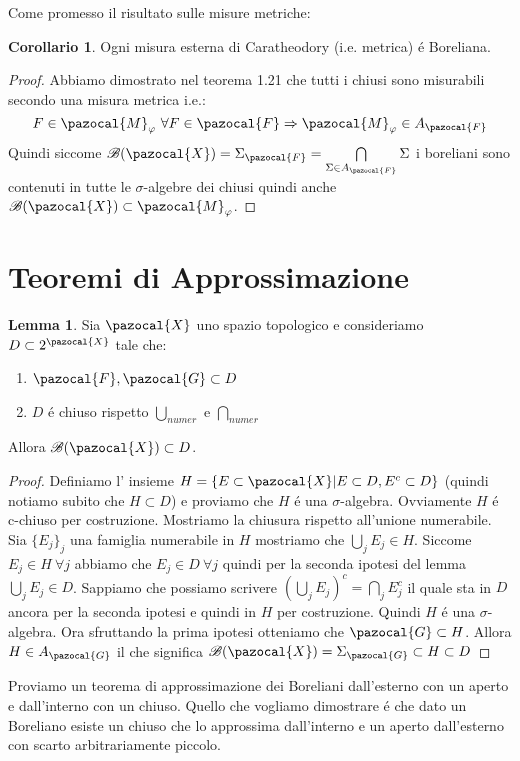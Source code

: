 \documentclass[11pt,a4paper]{report}
\theoremstyle{plain}
\theoremstyle{definition}
\newtheorem{cor}[thm]{Corollario} %
\newtheorem{lem}[thm]{Lemma} %
\newcommand{\M}{\pazocal{M}_\varphi}
\newcommand{\X}{\pazocal{X}}
\newcommand{\F}{\pazocal{F}}
\newcommand{\G}{\pazocal{G}}
\newcommand{\B}{\mathcal{B}}
\begin{document}
Come promesso il risultato sulle misure metriche:

\begin{cor}
	Ogni misura esterna di Caratheodory (i.e. metrica) \'e Boreliana.
	\begin{proof}
		Abbiamo dimostrato nel teorema 1.21 che tutti i chiusi sono misurabili secondo una misura metrica i.e.:
		\[
			F \in \M \ \forall F\in \F \Rightarrow \M \in A_\F
		\]
		Quindi siccome $\B(\X) = \Sigma_\F = \bigcap\limits_{\Sigma \in A_\F}\Sigma$ i boreliani sono contenuti in tutte le $\sigma$-algebre dei chiusi quindi anche $\B(\X)\subset \M$.
	\end{proof}
\end{cor}

\section{Teoremi di Approssimazione}

\begin{lem}
	Sia $\X$ uno spazio topologico e consideriamo $D \subset 2^\X$ tale che:
	\begin{enumerate}
		\item $\F,\G \subset D$
		\item $D$ \'e chiuso rispetto $\bigcup\limits_{numer}$ e $\bigcap\limits_{numer}$
	\end{enumerate}
	Allora $\B(\X) \subset D$.

	\begin{proof}
		Definiamo l' insieme $H=\left\{E \subset \X| E\subset D, E^c \subset D\right\}$ (quindi notiamo subito che $H \subset D$) e proviamo che $H$ \'e una $\sigma$-algebra. Ovviamente $H$ \'e c-chiuso per costruzione. Mostriamo la chiusura rispetto all'unione numerabile.
		Sia $\{E_j\}_j$ una famiglia numerabile in $H$ mostriamo che $\bigcup\limits_{j}E_j \in H$. Siccome $E_j \in H \ \forall j$ abbiamo che $E_j \in D \ \forall j$ quindi per la seconda ipotesi del lemma $\bigcup\limits_{j}E_j \in D$. Sappiamo che possiamo scrivere $(\bigcup\limits_{j}E_j)^c = \bigcap\limits_{j}E_j^c$ il quale sta in $D$ ancora per la seconda ipotesi e quindi in $H$ per costruzione. Quindi $H$ \'e una $\sigma$-algebra.
		Ora sfruttando la prima ipotesi otteniamo che $\G \subset H$. Allora $H \in A_\G$ il che significa $\B(\X) = \Sigma_\G \subset H \subset D$
	\end{proof}
\end{lem}

Proviamo un teorema di approssimazione dei Boreliani dall'esterno con un aperto e dall'interno con un chiuso. Quello che vogliamo dimostrare \'e che dato un Boreliano esiste un chiuso che lo approssima dall'interno e un aperto dall'esterno con scarto arbitrariamente piccolo.
\end{document}
